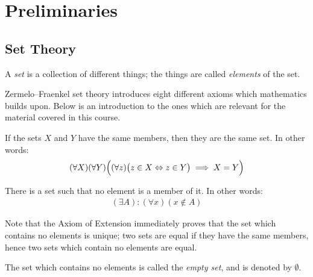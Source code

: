 \chapter{Preliminaries}
\section{Set Theory}

    \begin{definition}
        A \textit{set} is a collection of different things; the things are called \textit{elements} of the set.
    \end{definition}

    Zermelo–Fraenkel set theory introduces eight different axioms which mathematics builds upon. Below is an introduction to the ones which are relevant for the material covered in this course.

    \begin{axiom}
        If the sets $X$ and $Y$ have the same members, then they are the same set. In other words:
            \begin{equation*}
            \begin{split}
                (\forall X)(\forall Y)\Bigl((\forall z)\bigl(z \in X \Leftrightarrow z \in Y\bigr) \implies X = Y\Bigr)
            \end{split}
            \end{equation*}
    \end{axiom}

    \begin{axiom}
        There is a set such that no element is a member of it. In other words:
            \begin{equation*}
            \begin{split}
                (\exists A):(\forall x)(x \not\in A)
            \end{split}
            \end{equation*}
    \end{axiom}

    Note that the Axiom of Extension immediately proves that the set which contains no elements is unique; two sets are equal if they have the same members, hence two sets which contain no elements are equal.

    \begin{definition}
        The set which contains no elements is called the \textit{empty set}, and is denoted by $\emptyset$.
    \end{definition}


